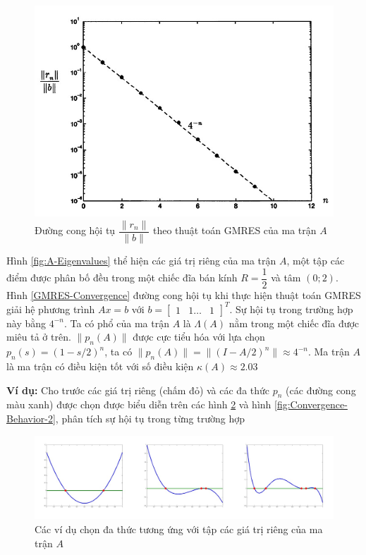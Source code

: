 \documentclass[14pt, a4paper]{article}
\numberwithin{equation}{section}
\numberwithin{algorithm}{section}
\numberwithin{figure}{section}
\numberwithin{dl}{section}
\numberwithin{md}{section}
\numberwithin{bd}{section}
\numberwithin{dn}{section}
\begin{document}
\begin{figure}[h!] \centering

    \includegraphics[scale=0.6]{GMRES-Convergence-Curve.jpg}
    \caption{Đường cong hội tụ $\dfrac{\lVert r_n \rVert}{\lVert b \rVert} $ theo thuật toán GMRES của ma trận $A$ \cite{trefethen1997numerical}}

    \label{fig:GMRES-Convergence-Curve}
\end{figure}

Hình \ref{fig:A-Eigenvalues} thể hiện các giá trị riêng của ma trận $A$, một tập các điểm được phân bố đều trong một chiếc đĩa bán kính $R=\dfrac{1}{2}$ và tâm $(0;2)$. Hình \ref{GMRES-Convergence} đường cong hội tụ khi thực hiện thuật toán GMRES giải hệ phương trình $Ax=b$ với $b=\begin{bmatrix} 1 & 1 \dots & 1 \end{bmatrix}^T$. Sự hội tụ trong trường hợp này bằng $4^{-n}$. Ta có phổ của ma trận $A$ là $\Lambda(A)$ nằm trong một chiếc đĩa được miêu tả ở trên. $\lVert p_n(A) \rVert $ được cực tiểu hóa với lựa chọn $p_n(s)=(1-s/2)^n$, ta có $\lVert p_n(A) \rVert = \lVert (I - A/2)^n \rVert \approx 4^{-n}$. Ma trận $A$ là ma trận có điều kiện tốt với số điều kiện $\kappa(A) \approx 2.03$

\textbf{Ví dụ:} Cho trước các giá trị riêng (chấm đỏ) và các đa thức $p_n$ (các đường cong màu xanh) được chọn được biểu diễn trên các hình \ref{fig:Convergence-Behavior-1} và hình \ref{fig:Convergence-Behavior-2}, phân tích sự hội tụ trong từng trường hợp

\begin{figure}[h!] \centering

    \includegraphics[scale=0.5]{Convergence-Behavior-1.jpg}
    \caption{Các ví dụ chọn đa thức tương ứng với tập các giá trị riêng của ma trận $A$}

    \label{fig:Convergence-Behavior-1}
\end{figure}
\end{document}
